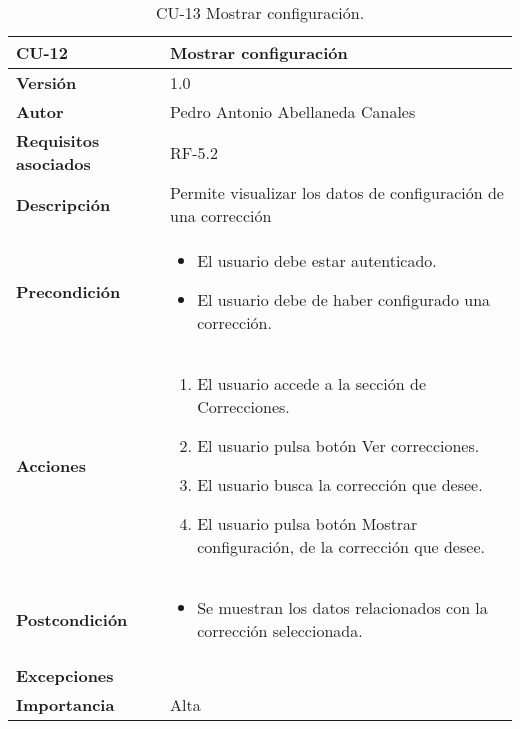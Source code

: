 \begin{table}[p]
	\centering
	\begin{tabularx}{\linewidth}{ p{} p{} }
		\toprule
		\textbf{CU-12}    & \textbf{Mostrar configuración} \\
		\midrule
		\textbf{Versión}              & 1.0    \\
		\textbf{Autor}                & Pedro Antonio Abellaneda Canales \\
		\textbf{Requisitos asociados} & RF-5.2 \\
		\textbf{Descripción}          & Permite visualizar los datos de configuración de una corrección \\
		\textbf{Precondición}         & \begin{itemize}
                                        \tightlist
		                                  \item El usuario debe estar autenticado.
		                                  \item El usuario debe de haber configurado una corrección.
		                                 \end{itemize} \\
		\textbf{Acciones}             &
                            		\begin{enumerate}
                            			\def\labelenumi{\arabic{enumi}.}
                            			\tightlist
                            			\item El usuario accede a la sección de Correcciones.
                                        \item El usuario pulsa botón Ver correcciones.
                                        \item El usuario busca la corrección que desee.
                                        \item El usuario pulsa botón Mostrar configuración, de la corrección que desee.
                            		\end{enumerate} \\
		\textbf{Postcondición}        & \begin{itemize}
                                        \tightlist
		                                  \item Se muestran los datos relacionados con la corrección seleccionada.
		                                 \end{itemize} \\
		\textbf{Excepciones}         & \\
		\textbf{Importancia}          & Alta \\
		\bottomrule
	\end{tabularx}
	\caption{CU-13 Mostrar configuración.}
	\label{tab:CU-13}
\end{table}


